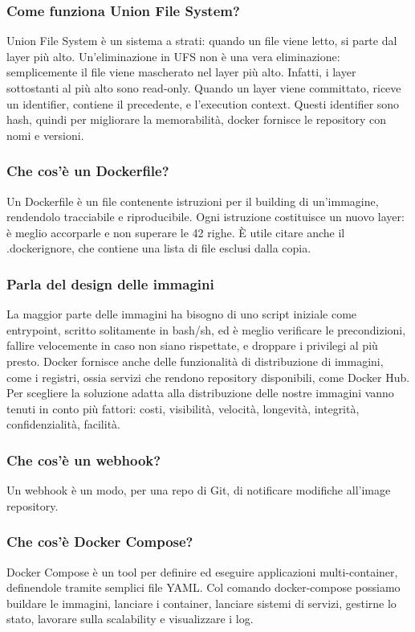 \documentclass[11pt]{article}
\begin{document}
\subsubsection{Come funziona Union File System?}
Union File System è un sistema a strati: quando un file viene letto, si parte dal layer più alto. Un'eliminazione in UFS non è una vera eliminazione: semplicemente il file viene mascherato nel layer più alto. Infatti, i layer sottostanti al più alto sono read-only. Quando un layer viene committato, riceve un identifier, contiene il precedente, e l'execution context. Questi identifier sono hash, quindi per migliorare la memorabilità, docker fornisce le repository con nomi e versioni. 

\subsubsection{Che cos'è un Dockerfile?}
Un Dockerfile è un file contenente istruzioni per il building di un'immagine, rendendolo tracciabile e riproducibile. Ogni istruzione costituisce un nuovo layer: è meglio accorparle e non superare le 42 righe. È utile citare anche il .dockerignore, che contiene una lista di file esclusi dalla copia. 

\subsubsection{Parla del design delle immagini}
La maggior parte delle immagini ha bisogno di uno script iniziale come entrypoint, scritto solitamente in bash/sh, ed è meglio verificare le precondizioni, fallire velocemente in caso non siano rispettate, e droppare i privilegi al più presto. Docker fornisce anche delle funzionalità di distribuzione di immagini, come i registri, ossia servizi che rendono repository disponibili, come Docker Hub. Per scegliere la soluzione adatta alla distribuzione delle nostre immagini vanno tenuti in conto più fattori: costi, visibilità, velocità, longevità, integrità, confidenzialità, facilità. 


\subsubsection{Che cos'è un webhook?}
Un webhook è un modo, per una repo di Git, di notificare modifiche all'image repository. 

\subsubsection{Che cos'è Docker Compose?}
Docker Compose è un tool per definire ed eseguire applicazioni multi-container, definendole tramite semplici file YAML. Col comando docker-compose possiamo buildare le immagini, lanciare i container, lanciare sistemi di servizi, gestirne lo stato, lavorare sulla scalability e visualizzare i log. 
\end{document}
